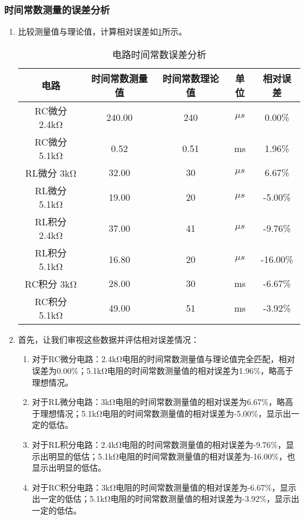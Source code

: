 \documentclass[dvipsnames, svgnames,a4paper,11pt]{article}
\begin{document}
	\subsubsection{时间常数测量的误差分析}
	\begin{enumerate}
		\item 比较测量值与理论值，计算相对误差如\cref{tab:tab2}所示。
		
		\begin{table}[h]
			\centering
			\caption{电路时间常数误差分析}
			\label{tab:tab2}
			\begin{tabular}{|c|c|c|c|c|}
				\hline
				电路 & 时间常数测量值 & 时间常数理论值 & 单位 & 相对误差 \\
				\hline
				RC微分 2.4kΩ & 240.00 & 240 & $\mu s$ & 0.00\% \\
				RC微分 5.1kΩ & 0.52 & 0.51 & ms & 1.96\% \\
				RL微分 3kΩ & 32.00 & 30 & $\mu s$ & 6.67\% \\
				RL微分 5.1kΩ & 19.00 & 20 & $\mu s$ & -5.00\% \\
				RL积分 2.4kΩ & 37.00 & 41 & $\mu s$ & -9.76\% \\
				RL积分 5.1kΩ & 16.80 & 20 & $\mu s$ & -16.00\% \\
				RC积分 3kΩ & 28.00 & 30 & ms & -6.67\% \\
				RC积分 5.1kΩ & 49.00 & 51 & ms & -3.92\% \\
				\hline
			\end{tabular}
		\end{table}
		
		\item 首先，让我们审视这些数据并评估相对误差情况：
		
		\begin{enumerate}
			\item 对于RC微分电路：2.4kΩ电阻的时间常数测量值与理论值完全匹配，相对误差为0.00\%；5.1kΩ电阻的时间常数测量值的相对误差为1.96\%，略高于理想情况。
			
			\item 对于RL微分电路：3kΩ电阻的时间常数测量值的相对误差为6.67\%，略高于理想情况；5.1kΩ电阻的时间常数测量值的相对误差为-5.00\%，显示出一定的低估。
			
			\item 对于RL积分电路：2.4kΩ电阻的时间常数测量值的相对误差为-9.76\%，显示出明显的低估；5.1kΩ电阻的时间常数测量值的相对误差为-16.00\%，也显示出明显的低估。
			
			\item 对于RC积分电路：3kΩ电阻的时间常数测量值的相对误差为-6.67\%，显示出一定的低估；5.1kΩ电阻的时间常数测量值的相对误差为-3.92\%，显示出一定的低估。
		\end{enumerate}
		

\end{enumerate}
\end{document}
